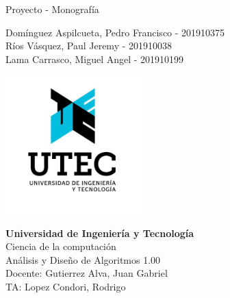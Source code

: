 \begin{titlepage}
    \begin{center}
        \vspace*{1cm}
            
        \Huge
        Proyecto - Monografía
            
        \vspace{1cm}
        \Large
        Domínguez Aspilcueta, Pedro Francisco - 201910375\\
        Ríos Vásquez, Paul Jeremy - 201910038\\
        Lama Carrasco, Miguel Angel - 201910199\\
            
        \vfill
            
        \includegraphics[width=0.4\textwidth]{logo.jpg}
            
        \normalsize
        \textbf{Universidad de Ingeniería y Tecnología}\\
        Ciencia de la computación\\
        Análisis y Diseño de Algoritmos 1.00\\
        Docente: Gutierrez Alva, Juan Gabriel\\
        TA: Lopez Condori, Rodrigo\\
    \end{center}
\end{titlepage}